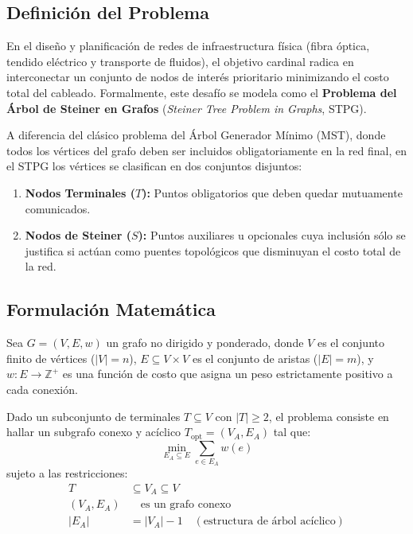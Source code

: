 \documentclass[11pt,a4paper]{article}
\begin{document}
\subsection{Definición del Problema}
En el diseño y planificación de redes de infraestructura física (fibra óptica, tendido eléctrico y transporte de fluidos), el objetivo cardinal radica en interconectar un conjunto de nodos de interés prioritario minimizando el costo total del cableado. Formalmente, este desafío se modela como el \textbf{Problema del Árbol de Steiner en Grafos} (\textit{Steiner Tree Problem in Graphs}, STPG).

A diferencia del clásico problema del Árbol Generador Mínimo (MST), donde todos los vértices del grafo deben ser incluidos obligatoriamente en la red final, en el STPG los vértices se clasifican en dos conjuntos disjuntos:
\begin{enumerate}
    \item \textbf{Nodos Terminales ($T$):} Puntos obligatorios que deben quedar mutuamente comunicados.
    \item \textbf{Nodos de Steiner ($S$):} Puntos auxiliares u opcionales cuya inclusión sólo se justifica si actúan como puentes topológicos que disminuyan el costo total de la red.
\end{enumerate}

\subsection{Formulación Matemática}
Sea $G = (V, E, w)$ un grafo no dirigido y ponderado, donde $V$ es el conjunto finito de vértices ($|V| = n$), $E \subseteq V \times V$ es el conjunto de aristas ($|E| = m$), y $w: E \to \mathbb{Z}^+$ es una función de costo que asigna un peso estrictamente positivo a cada conexión.

Dado un subconjunto de terminales $T \subseteq V$ con $|T| \ge 2$, el problema consiste en hallar un subgrafo conexo y acíclico $T_{\text{opt}} = (V_A, E_A)$ tal que:
\begin{equation}
    \min_{E_A \subseteq E} \sum_{e \in E_A} w(e)
\end{equation}
sujeto a las restricciones:
\begin{align}
    T &\subseteq V_A \subseteq V \\
    (V_A, E_A) &\quad \text{es un grafo conexo} \\
    |E_A| &= |V_A| - 1 \quad (\text{estructura de árbol acíclico})
\end{align}
\end{document}
